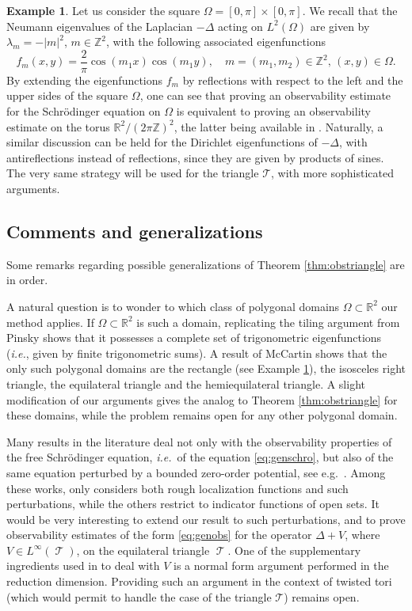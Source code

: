 \documentclass[a4paper,11pt]{amsart}
\numberwithin{equation}{section}
\theoremstyle{definition}
\newtheorem{ex}[thm]{Example}
\DeclareMathOperator{\var}{\mathcal T}
\begin{document}
\begin{ex} \label{ex:rec} Let us consider the square $\Omega = [0,\pi]\times[0,\pi]$. We recall that the Neumann eigenvalues of the Laplacian $-\Delta$ acting on $L^2(\Omega)$ are given by $\lambda_m = -\vert m\vert^2$, $m\in\mathbb Z^2$, with the following associated eigenfunctions
\[
    f_m(x,y) = \frac2{\pi}\cos(m_1x)\cos(m_1y),\quad m=(m_1,m_2)\in\mathbb Z^2,\,(x,y)\in\Omega.
\]
By extending the eigenfunctions $f_m$ by reflections with respect to the left and the upper sides of the square $\Omega$, one can see that proving an observability estimate for the Schr\"odinger equation on $\Omega$ is equivalent to proving an observability estimate on the torus $\mathbb R^2/(2\pi\mathbb Z)^2$, the latter being available in \cite{BZ}. Naturally, a similar discussion can be held for the Dirichlet eigenfunctions of $-\Delta$, with antireflections instead of reflections, since they are given by products of sines. The very same strategy will be used for the triangle $\mathcal T$, with more sophisticated arguments.
\end{ex}

\subsection{Comments and generalizations}

Some remarks regarding possible generalizations of Theorem \ref{thm:obstriangle} are in order.

 
A natural question is to wonder to which class of polygonal domains $\Omega\subset\mathbb R^2$ our method applies. If  $\Omega\subset\mathbb R^2$ is such a domain, replicating the tiling argument from Pinsky \cite{P2} shows that it possesses a complete set of trigonometric eigenfunctions (\textit{i.e.}, given by finite trigonometric sums). A result of McCartin \cite{MC} shows that the only such polygonal domains are the rectangle (see Example \ref{ex:rec}), the isosceles right triangle, the equilateral triangle and the hemiequilateral triangle. A slight modification of our arguments 
gives the analog to Theorem \ref{thm:obstriangle} for these domains, while the problem remains open for any other polygonal domain.

Many results in the literature deal not only with the observability properties of the free Schr\"odinger equation, \textit{i.e.}~of the equation \eqref{eq:genschro}, but also of the same equation perturbed by a bounded zero-order potential, see e.g.~\cite{AFM, AM, Bou, BBZ, LBM, Ma}. Among these works, only \cite{LBM} considers both rough localization functions and such perturbations, while the others restrict to 
indicator functions of open sets.
It would 
be very interesting to
extend our result to such perturbations,
 and to prove observability estimates of the form \eqref{eq:genobs} for the operator $\Delta+V$, where $V\in L^{\infty}(\var)$,  on the equilateral triangle $\var$. One of the supplementary ingredients used in  \cite{BZ} to deal with $V$ is a normal form argument  performed  in the reduction dimension. Providing such an argument in the context of twisted tori (which would permit to handle the case of the triangle $\mathcal T$) remains open.
\end{document}
